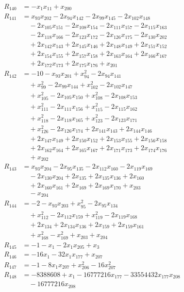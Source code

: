 \begin{align*}
R_{140}&=-x_{1}x_{11}+x_{200}\\
R_{141}&=x_{93}x_{202}-2x_{94}x_{142}-2x_{99}x_{145}-2x_{102}x_{148}\\
&\quad{}-2x_{105}x_{151}-2x_{108}x_{154}-2x_{111}x_{157}-2x_{115}x_{163}\\
&\quad{}-2x_{118}x_{166}-2x_{123}x_{172}-2x_{126}x_{175}-2x_{130}x_{202}\\
&\quad{}+2x_{142}x_{143}+2x_{145}x_{146}+2x_{148}x_{149}+2x_{151}x_{152}\\
&\quad{}+2x_{154}x_{155}+2x_{157}x_{158}+2x_{163}x_{164}+2x_{166}x_{167}\\
&\quad{}+2x_{172}x_{173}+2x_{175}x_{176}+x_{201}\\
R_{142}&=-10-x_{93}x_{201}+x_{94}^{2}-2x_{94}x_{141}\\
&\quad{}+x_{99}^{2}-2x_{99}x_{144}+x_{102}^{2}-2x_{102}x_{147}\\
&\quad{}+x_{105}^{2}-2x_{105}x_{150}+x_{108}^{2}-2x_{108}x_{153}\\
&\quad{}+x_{111}^{2}-2x_{111}x_{156}+x_{115}^{2}-2x_{115}x_{162}\\
&\quad{}+x_{118}^{2}-2x_{118}x_{165}+x_{123}^{2}-2x_{123}x_{171}\\
&\quad{}+x_{126}^{2}-2x_{126}x_{174}+2x_{141}x_{143}+2x_{144}x_{146}\\
&\quad{}+2x_{147}x_{149}+2x_{150}x_{152}+2x_{153}x_{155}+2x_{156}x_{158}\\
&\quad{}+2x_{162}x_{164}+2x_{165}x_{167}+2x_{171}x_{173}+2x_{174}x_{176}\\
&\quad{}+x_{202}\\
R_{143}&=x_{93}x_{204}-2x_{95}x_{135}-2x_{112}x_{160}-2x_{119}x_{169}\\
&\quad{}-2x_{130}x_{204}+2x_{135}+2x_{135}x_{136}+2x_{160}\\
&\quad{}+2x_{160}x_{161}+2x_{169}+2x_{169}x_{170}+x_{203}\\
&\quad{}-x_{204}\\
R_{144}&=-2-x_{93}x_{203}+x_{95}^{2}-2x_{95}x_{134}\\
&\quad{}+x_{112}^{2}-2x_{112}x_{159}+x_{119}^{2}-2x_{119}x_{168}\\
&\quad{}+2x_{134}+2x_{134}x_{136}+2x_{159}+2x_{159}x_{161}\\
&\quad{}+x_{168}^{2}-x_{169}^{2}+x_{203}+x_{204}\\
R_{145}&=-1-x_{1}-2x_{1}x_{205}+x_{3}\\
R_{146}&=-16x_{1}-32x_{1}x_{177}+x_{207}\\
R_{147}&=-1-8x_{1}x_{207}+x_{206}^{2}-16x_{207}^{2}\\
R_{148}&=-8388608+x_{1}-16777216x_{177}-33554432x_{177}x_{208}\\
&\quad{}-16777216x_{208}\\
\end{align*}
\endgroup
